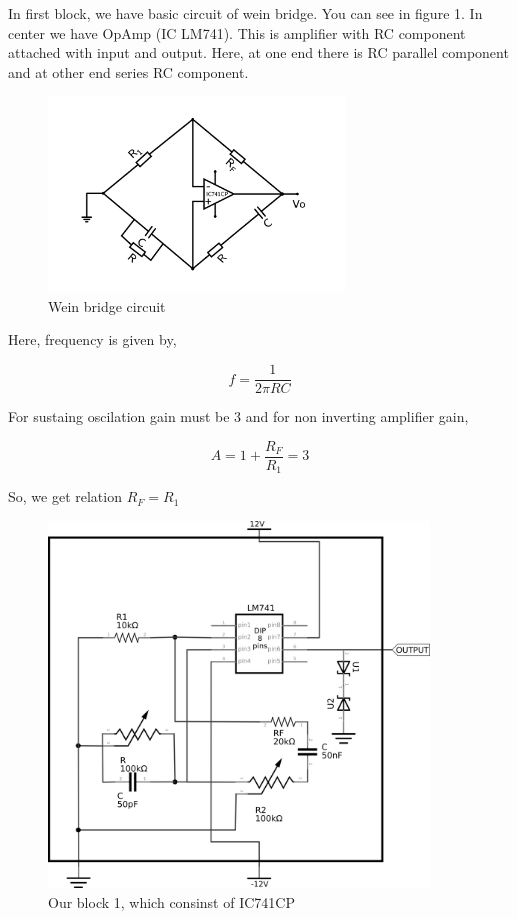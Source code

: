 \documentclass[12pt]{article}
\begin{document}
In first block, we have basic circuit of wein bridge. You can see in figure 1. In center we have OpAmp (IC LM741). This is amplifier with RC component attached with input and output. Here, at one end there is RC parallel component and at other end series RC component. 


\begin{figure}[H]
    \centering
    \label{sine}
    \includegraphics[width=0.7\textwidth]{imgs/sine.png}
    \caption{Wein bridge circuit}
\end{figure}

Here, frequency is given by, 

\begin{equation}
\label{eq:org79ffd3b}
  f =\frac{1}{2 \pi RC}
\end{equation}

For sustaing oscilation gain must be 3 and for non inverting amplifier gain, 

\begin{equation}
\label{eq:orgfd4df13}
  A = 1+\frac{R_{F}}{R_{1}} = 3
\end{equation}

So, we get relation \(R_{F}=R_{1}\)

\begin{figure}[ht]
    \centering
    \label{sinereal}
    \includegraphics[width=0.9\textwidth]{imgs/sinereal.png}
    \caption{Our block 1, which consinst of IC741CP}
\end{figure}
\end{document}
